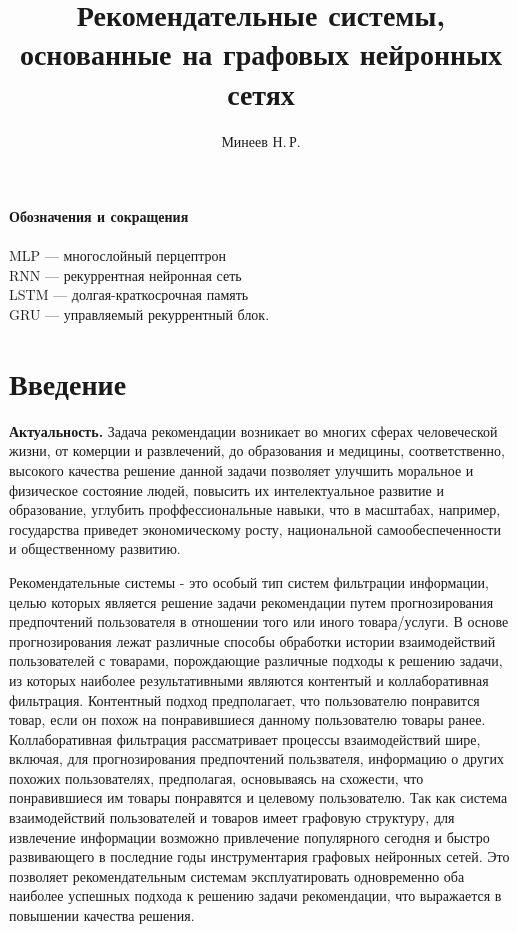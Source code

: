 \documentclass[a4paper,14pt,oneside]{mipt-thesis-ms}
\title{Рекомендательные системы, основанные на графовых нейронных сетях}
\author{Минеев Н.\,Р.}
\begin{document}
\frontmatter
\titlecontents

\mainmatter

\newpage
{\large \bf Обозначения и сокращения}\\\\
MLP --- многослойный перцептрон \cite{haykin01}\\
RNN --- рекуррентная нейронная сеть \cite{sajid01}\\
LSTM --- долгая-краткосрочная память \cite{hochreiter01}\\
GRU --- управляемый рекуррентный блок. \cite{kyunghyun01}\\


\chapter{Введение}
{\bf Актуальность.} Задача рекомендации возникает во многих сферах человеческой жизни, от комерции и развлечений\cite{zangerle01}, до образования\cite{rivera01} и медицины\cite{tran01}, соответственно, высокого качества решение данной задачи позволяет улучшить моральное и физическое состояние людей, повысить их интелектуальное развитие и образование, углубить проффессиональные навыки, что в масштабах, например, государства приведет экономическому росту, национальной самообеспеченности и общественному развитию.

Рекомендательные системы - это особый тип систем фильтрации информации, целью которых является решение задачи рекомендации путем прогнозирования предпочтений пользователя в отношении того или иного товара/услуги\cite{peng01}. В основе прогнозирования лежат различные способы обработки истории взаимодействий пользователей с товарами, порождающие различные подходы к решению задачи, из которых наиболее результативными являются контентый и коллаборативная фильтрация.  
Контентный подход предполагает, что пользователю понравится товар, если он похож на понравившиеся данному пользователю товары ранее\cite{ricci01}. Коллаборативная фильтрация рассматривает процессы взаимодействий шире, включая, для прогнозирования предпочтений пользвателя, информацию о других похожих пользователях, предполагая, основываясь на схожести, что понравившиеся им товары понравятся и целевому пользователю\cite{chen02}. Так как система взаимодействий пользователей и товаров имеет графовую структуру, для извлечение информации возможно привлечение популярного сегодня и быстро развивающего в последние годы инструментария графовых нейронных сетей. Это позволяет рекомендательным системам эксплуатировать одновременно оба наиболее успешных подхода к решению задачи рекомендации, что выражается в повышении качества решения\cite{wu01}.
\end{document}
